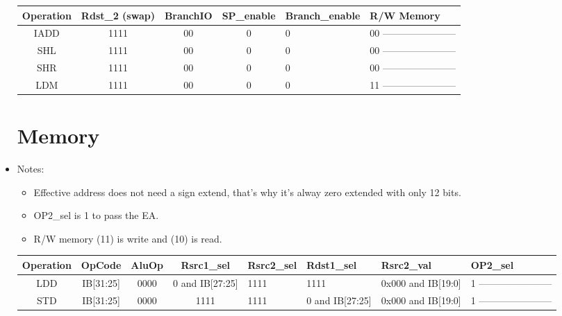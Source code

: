 \documentclass[12pt]{report}
\begin{document}
\begin{itemize}
\begin{center}
\begin{tabular}{||c| c| c| c| p{40mm}||}
        \end{tabular}
        \end{center}

        \begin{center}
        \begin{tabular}{||c| c| c| c| p{40mm}||} 
        \hline
        Operation & Rdst_2 (swap) & BranchIO & SP_enable & Branch_enable & R/W Memory  \\ [0.5ex] 
        \hline\hline
        IADD & 1111 & 00 & 0 & 0 & 00 ----------------------- \\
        \hline
        SHL & 1111 & 00 & 0 & 0 & 00 ----------------------- \\
        \hline
        SHR & 1111 & 00 & 0 & 0 & 00 ----------------------- \\
        \hline
        LDM & 1111 & 00 & 0 & 0 & 11 ----------------------- \\
        \hline

        \end{tabular}
        \end{center}



        \section{Memory}
        \item Notes:
        \begin{itemize}
            \item Effective address does not need a sign extend, that's why it's alway zero extended with only 12 bits.
            \item OP2_sel is 1 to pass the EA.
            \item R/W memory (11) is write and (10) is read.
        \end{itemize}

        \begin{center}
        \begin{tabular}{||c| c| c| c| p{40mm}||} 
        \hline
        Operation & OpCode & AluOp & Rsrc1_sel & Rsrc2_sel & Rdst1_sel & Rsrc2_val & OP2_sel  \\ [0.5ex] 
        \hline\hline
        LDD & IB[31:25] & 0000 & 0 and IB[27:25] & 1111 & 1111 & 0x000 and IB[19:0] & 1 ----------------------- \\
        \hline
        STD & IB[31:25] & 0000 & 1111 & 1111 & 0 and IB[27:25] & 0x000 and IB[19:0] & 1 ----------------------- \\
        \hline


\end{tabular}
\end{center}
\end{itemize}
\end{document}
